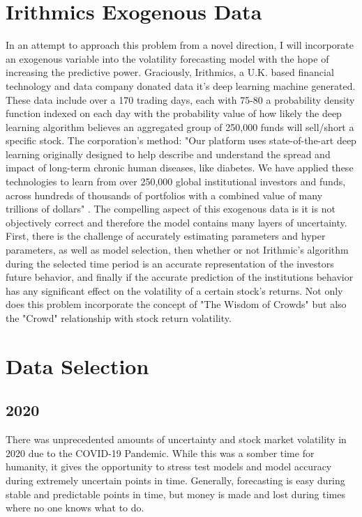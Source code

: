 \section{Irithmics Exogenous Data}

In an attempt to approach this problem from a novel direction, I will incorporate an exogenous variable into the volatility forecasting model with the hope of increasing the predictive power. Graciously, Irithmics, a U.K. based financial technology and data company donated data it's deep learning machine generated. These data include over a 170 trading days, each with 75-80 a probability density function indexed on each day with the probability value of how likely the deep learning algorithm believes an aggregated group of 250,000 funds will sell/short a specific stock. The corporation's method: 
"Our platform uses state-of-the-art deep learning originally designed to help describe and understand the spread and impact of long-term chronic human diseases, like diabetes. We have applied these technologies to learn from over 250,000 global institutional investors and funds, across hundreds of thousands of portfolios with a combined value of many trillions of dollars" \cite{Irithmics}. The compelling aspect of this exogenous data is it is not objectively correct and therefore the model contains many layers of uncertainty. First, there is the challenge of accurately estimating parameters and hyper parameters, as well as model selection, then whether or not Irithmic's algorithm during the selected time period is an accurate representation of the investors future behavior, and finally if the accurate prediction of the institutions behavior has any significant effect on the volatility of a certain stock's returns. Not only does this problem incorporate the concept of "The Wisdom of Crowds" but also the "Crowd" relationship with stock return volatility.

\section{Data Selection}
\subsection{2020}
There was unprecedented amounts of uncertainty and stock market volatility in 2020 due to the COVID-19 Pandemic. While this was a somber time for humanity, it gives the opportunity to stress test models and model accuracy during extremely uncertain points in time. Generally, forecasting is easy during stable and predictable points in time, but money is made and lost during times where no one knows what to do.  
